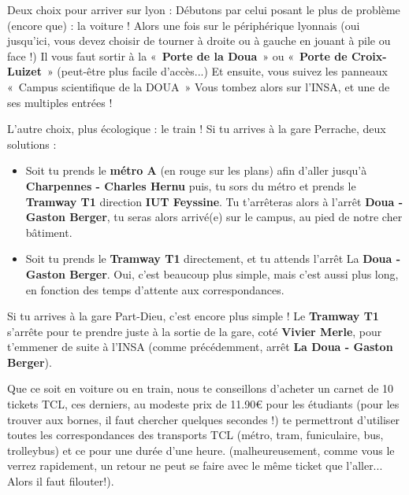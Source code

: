 Deux choix pour arriver sur lyon :
Débutons par celui posant le plus de problème (encore que) : la voiture !
Alors une fois sur le périphérique lyonnais (oui jusqu'ici, vous devez choisir de tourner à droite ou à gauche en jouant à pile ou face !)
Il vous faut sortir à la «~\textbf{Porte de la Doua}~» ou «~\textbf{Porte de
    Croix-Luizet}~» (peut-être plus facile d'accès...)
Et ensuite, vous suivez les panneaux «~Campus scientifique de la DOUA~»
Vous tombez alors sur l'INSA, et une de ses multiples entrées !

L'autre choix, plus écologique : le train !
Si tu arrives à la gare Perrache, deux solutions :
\begin{itemize}
    \item Soit tu prends le \textbf{métro A} (en rouge sur les plans) afin
    d'aller jusqu'à \textbf{Charpennes - Charles Hernu} puis, tu
    sors du métro et prends le \textbf{Tramway T1} direction
    \textbf{IUT Feyssine}. Tu t'arrêteras alors à l'arrêt
    \textbf{Doua - Gaston Berger}, tu seras alors arrivé(e) sur le campus, au pied de notre cher bâtiment.

    \item Soit tu prends le \textbf{Tramway T1} directement, et tu
    attends l'arrêt La \textbf{Doua - Gaston Berger}. Oui, c'est
    beaucoup plus simple, mais c'est aussi plus long, en fonction des
    temps d'attente aux correspondances.
\end{itemize}


Si tu arrives à la gare Part-Dieu, c'est encore plus simple ! Le
\textbf{Tramway T1} s'arrête pour te prendre juste à la sortie de la gare,
coté \textbf{Vivier Merle}, pour t'emmener de suite à l'INSA (comme
précédemment, arrêt \textbf{La Doua - Gaston Berger}).


Que ce soit en voiture ou en train, nous te conseillons d'acheter un carnet de
10 tickets TCL, ces derniers, au modeste prix de 11.90€ pour les étudiants (pour
les trouver aux bornes, il faut chercher quelques secondes !) te
permettront d'utiliser toutes les correspondances des transports TCL (métro,
tram, funiculaire, bus, trolleybus) et ce pour une durée d'une heure.
(malheureusement, comme vous le verrez rapidement, un retour ne peut se faire
avec le même ticket que l'aller... Alors il faut filouter!).

